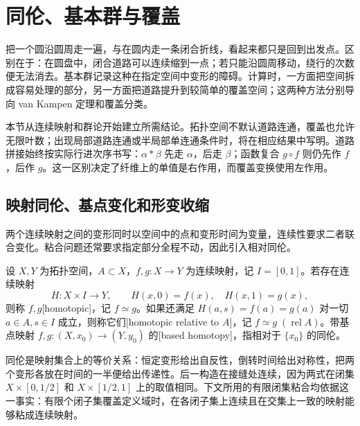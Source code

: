 
% 
% 

\section{同伦、基本群与覆盖}
\label{g2:sec:0101}

把一个圆沿圆周走一遍，与在圆内走一条闭合折线，看起来都只是回到出发点。区别在于：在圆盘中，闭合道路可以连续缩到一点；若只能沿圆周移动，绕行的次数便无法消去。基本群记录这种在指定空间中变形的障碍。计算时，一方面把空间拆成容易处理的部分，另一方面把道路提升到较简单的覆盖空间；这两种方法分别导向 van Kampen 定理和覆盖分类。

\ProseParagraphBreak

本节从连续映射和群论开始建立所需结论。拓扑空间不默认道路连通，覆盖也允许无限叶数；出现局部道路连通或半局部单连通条件时，将在相应结果中写明。道路拼接始终按实际行进次序书写：\(\alpha*\beta\) 先走 \(\alpha\)，后走 \(\beta\)；函数复合 \(g\circ f\) 则仍先作 \(f\)，后作 \(g\)。这一区别决定了纤维上的单值是右作用，而覆盖变换使用左作用。

\subsection{映射同伦、基点变化和形变收缩}
\label{g2:subsec:0101:01}
两个连续映射之间的变形同时以空间中的点和变形时间为变量，连续性要求二者联合变化。粘合问题还常要求指定部分全程不动，因此引入相对同伦。

\begin{definition}[映射同伦与相对同伦]\label{g2:def:homotopy-relative}
	设 \(X,Y\) 为拓扑空间，\(A\subset X\)，\(f,g:X\rightarrow Y\) 为连续映射，记 \(I=[0,1]\)。若存在连续映射
	\[
		H:X\times I\longrightarrow Y,\qquad H(x,0)=f(x),\quad H(x,1)=g(x),
	\]
	则称 \(f,g\)[homotopic]，记 \(f\simeq g\)。如果还满足 \(H(a,s)=f(a)=g(a)\) 对一切 \(a\in A,s\in I\) 成立，则称它们[homotopic relative to \(A\)]，记 \(f\simeq g\;(\operatorname{rel}A)\)。带基点映射 \(f,g:(X,x_0)\rightarrow(Y,y_0)\) 的[based homotopy]，指相对于 \(\{x_0\}\) 的同伦。
\end{definition}

同伦是映射集合上的等价关系：恒定变形给出自反性，倒转时间给出对称性，把两个变形各放在时间的一半便给出传递性。后一构造在接缝处连续，因为两式在闭集 \(X\times[0,1/2]\) 和 \(X\times[1/2,1]\) 上的取值相同。下文所用的有限闭集粘合均依据这一事实：有限个闭子集覆盖定义域时，在各闭子集上连续且在交集上一致的映射能够粘成连续映射。


